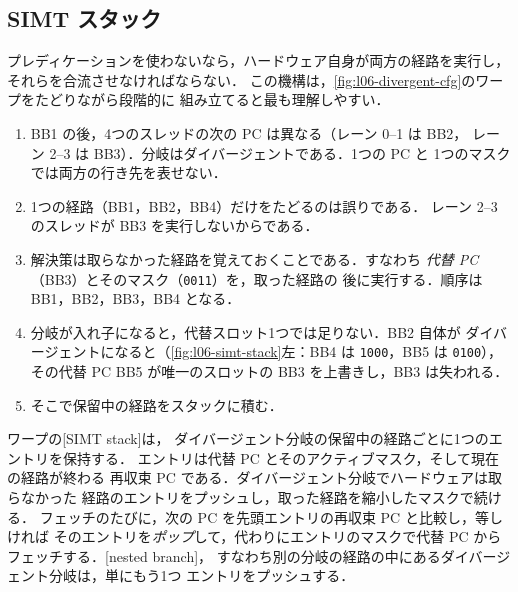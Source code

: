\documentclass[../main.tex]{subfiles}
\begin{document}
\subsection{SIMT スタック}
\label{sec:l06-simt-stack}

プレディケーションを使わないなら，ハードウェア自身が両方の経路を実行し，
それらを合流させなければならない．
この機構は，\cref{fig:l06-divergent-cfg}のワープをたどりながら段階的に
組み立てると最も理解しやすい．
\begin{enumerate}
  \item BB1 の後，4つのスレッドの次の PC は異なる（レーン 0--1 は BB2，
    レーン 2--3 は BB3）．分岐はダイバージェントである．1つの PC と
    1つのマスクでは両方の行き先を表せない．
  \item 1つの経路（BB1，BB2，BB4）だけをたどるのは誤りである．
    レーン 2--3 のスレッドが BB3 を実行しないからである．
  \item 解決策は取らなかった経路を覚えておくことである．すなわち
    \emph{代替 PC}（BB3）とそのマスク（\texttt{0011}）を，取った経路の
    後に実行する．順序は BB1，BB2，BB3，BB4 となる．
  \item 分岐が入れ子になると，代替スロット1つでは足りない．BB2 自体が
    ダイバージェントになると（\cref{fig:l06-simt-stack}左：BB4 は
    \texttt{1000}，BB5 は \texttt{0100}），その代替 PC BB5 が唯一のスロットの
    BB3 を上書きし，BB3 は失われる．
  \item そこで保留中の経路をスタックに積む．
\end{enumerate}

\begin{definition}
  \label{def:l06-simt-stack}
  ワープの[SIMT stack]は，
  ダイバージェント分岐の保留中の経路ごとに1つのエントリを保持する．
  エントリは代替 PC とそのアクティブマスク，そして現在の経路が終わる
  再収束 PC である．ダイバージェント分岐でハードウェアは取らなかった
  経路のエントリをプッシュし，取った経路を縮小したマスクで続ける．
  フェッチのたびに，次の PC を先頭エントリの再収束 PC と比較し，等しければ
  そのエントリを\emph{ポップ}して，代わりにエントリのマスクで代替 PC から
  フェッチする．[nested branch]，
  すなわち別の分岐の経路の中にあるダイバージェント分岐は，単にもう1つ
  エントリをプッシュする．
\end{definition}
\end{document}
